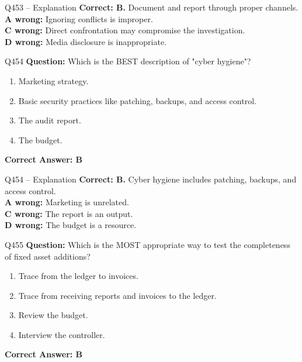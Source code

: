 \documentclass[aspectratio=169,10pt]{beamer}
\begin{document}
	\begin{frame}[t]{Q453 -- Explanation}
		\small
		\textbf{Correct: B.} Document and report through proper channels. \\[4pt]
		\textbf{A wrong:} Ignoring conflicts is improper. \\[2pt]
		\textbf{C wrong:} Direct confrontation may compromise the investigation. \\[2pt]
		\textbf{D wrong:} Media disclosure is inappropriate.
	\end{frame}
	
	\begin{frame}[t]{Q454}
		\small
		\textbf{Question:} Which is the BEST description of "cyber hygiene"?
		\begin{enumerate}[label=\Alph*.,itemsep=1pt,topsep=2pt]
			\item Marketing strategy.
			\item Basic security practices like patching, backups, and access control.
			\item The audit report.
			\item The budget.
		\end{enumerate}
		\vspace{4pt}
		\textbf{Correct Answer: B}
	\end{frame}
	
	\begin{frame}[t]{Q454 -- Explanation}
		\small
		\textbf{Correct: B.} Cyber hygiene includes patching, backups, and access control. \\[4pt]
		\textbf{A wrong:} Marketing is unrelated. \\[2pt]
		\textbf{C wrong:} The report is an output. \\[2pt]
		\textbf{D wrong:} The budget is a resource.
	\end{frame}
	
	\begin{frame}[t]{Q455}
		\small
		\textbf{Question:} Which is the MOST appropriate way to test the completeness of fixed asset additions?
		\begin{enumerate}[label=\Alph*.,itemsep=1pt,topsep=2pt]
			\item Trace from the ledger to invoices.
			\item Trace from receiving reports and invoices to the ledger.
			\item Review the budget.
			\item Interview the controller.
		\end{enumerate}
		\vspace{4pt}
		\textbf{Correct Answer: B}
	\end{frame}
	
\end{document}
